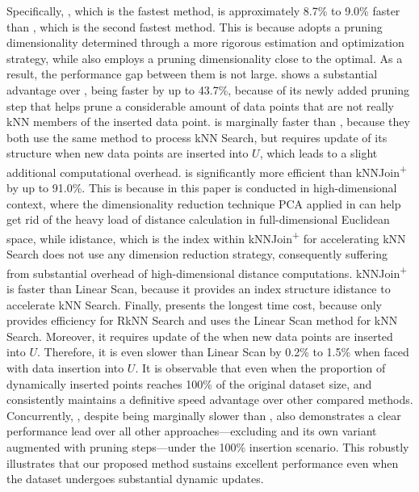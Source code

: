 Specifically, \cpdualtree, which is the fastest method, is approximately 8.7\% to 9.0\% faster than \spdualtree, which is the second fastest method. This is because \cpdualtree adopts a pruning dimensionality determined through a more rigorous estimation and optimization strategy, while \spdualtree also employs a pruning dimensionality close to the optimal. As a result, the performance gap between them is not large. \spdualtree shows a substantial advantage over \deltatree, being faster by up to 43.7\%, because of its newly added pruning step that helps prune a considerable amount of data points that are not really kNN members of the inserted data point.
\deltatree is marginally faster than \dualtree, because they both use the same method to process kNN Search, but \dualtree requires update of its \hdrtree structure when new data points are inserted into $U$, which leads to a slight additional computational overhead. \dualtree is  significantly more efficient than kNNJoin\textsuperscript{+} by up to 91.0\%. This is because \fdknnj in this paper is conducted in high-dimensional context, where the dimensionality reduction technique PCA applied in \deltatree can help get rid of the heavy load of distance calculation in full-dimensional Euclidean space, while idistance, which is the index within kNNJoin\textsuperscript{+} for accelerating kNN Search does not use any dimension reduction strategy, consequently suffering from substantial overhead of high-dimensional distance computations. kNNJoin\textsuperscript{+} is faster than Linear Scan, because it provides an index structure idistance to accelerate kNN Search. Finally, \hdrtree presents the longest time cost, because \hdrtree only provides efficiency for RkNN Search and uses the Linear Scan method for kNN Search. Moreover, it requires update of the \hdrtree when new data points are inserted into $U$. Therefore, it is even slower than Linear Scan by 0.2\% to 1.5\% when faced with data insertion into $U$. It is observable that even when the proportion of dynamically inserted points reaches 100\% of the original dataset size, \cpdualtree and \spdualtree consistently maintains a definitive speed advantage over other compared methods. Concurrently, \dualtree, despite being marginally slower than \deltatree, also demonstrates a clear performance lead over all other approaches—excluding \deltatree and its own variant augmented with pruning steps—under the 100\% insertion scenario. This robustly illustrates that our proposed method sustains excellent performance even when the dataset undergoes substantial dynamic updates.


